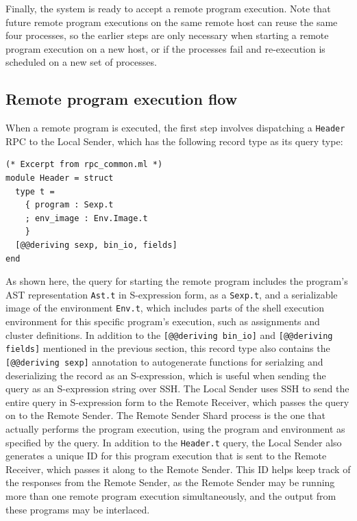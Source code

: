 \documentclass[oneside]{report}
\newcommand{\todoi}[1]{\todo[inline, color=blue!20]{TODO: {#1}}}
\begin{document}
Finally, the system is ready to accept a remote program execution.
Note that future remote program executions on the same remote host can reuse the same four processes, so the earlier steps are only necessary when starting a remote program execution on a new host, or if the processes fail and re-execution is scheduled on a new set of processes.

\subsection{Remote program execution flow}

When a remote program is executed, the first step involves dispatching a \texttt{Header} RPC to the Local Sender, which has the following record type as its query type:

\begin{minipage}[c]{\textwidth-15pt}
  \begin{lstlisting}
(* Excerpt from rpc_common.ml *)
module Header = struct
  type t =
    { program : Sexp.t
    ; env_image : Env.Image.t
    }
  [@@deriving sexp, bin_io, fields]
end
\end{lstlisting}
  \smallskip
\end{minipage}


As shown here, the query for starting the remote program includes the program's AST representation \texttt{Ast.t} in S-expression form, as a \texttt{Sexp.t}, and a serializable image of the environment \texttt{Env.t}, which includes parts of the shell execution environment for this specific program's execution, such as assignments and cluster definitions.
In addition to the \texttt{[@@deriving bin\_io]} and \texttt{[@@deriving fields]} mentioned in the previous section, this record type also contains the \texttt{[@@deriving sexp]} annotation to autogenerate functions for serialzing and deserializing the record as an S-expression, which is useful when sending the query as an S-expression string over SSH.
The Local Sender uses SSH to send the entire query in S-expression form to the Remote Receiver, which passes the query on to the Remote Sender.
The Remote Sender Shard process is the one that actually performs the program execution, using the program and environment as specified by the query.
In addition to the \texttt{Header.t} query, the Local Sender also generates a unique ID for this program execution that is sent to the Remote Receiver, which passes it along to the Remote Sender.
This ID helps keep track of the responses from the Remote Sender, as the Remote Sender may be running more than one remote program execution simultaneously, and the output from these programs may be interlaced.
\end{document}
